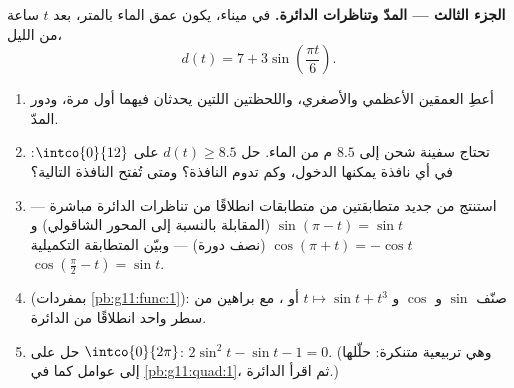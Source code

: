 \begin{problem}
\medskip
\noindent\textbf{الجزء الثالث --- المدّ وتناظرات
الدائرة.}
في ميناء، يكون عمق الماء بالمتر، بعد $t$ ساعة من
 الليل،
\[
d(t) = 7 + 3 \sin\!\left(\frac{\pi t}{6}\right).
\]
\begin{enumerate}[resume]
  \item أعطِ العمقين الأعظمي والأصغري، واللحظتين اللتين يحدثان
        فيهما أول مرة، ودور المدّ.
  \item تحتاج سفينة شحن إلى $8.5$ م من الماء. حل
        $d(t) \geq 8.5$ على $\intco{0}{12}$: في أي نافذة
        يمكنها الدخول، وكم تدوم النافذة؟ ومتى تُفتح
        النافذة التالية؟
  \item استنتج من جديد متطابقتين من متطابقات  انطلاقًا
        من تناظرات الدائرة مباشرة --- $\sin(\pi - t) = \sin t$ (المقابلة
        بالنسبة إلى المحور الشاقولي) و $\cos(\pi + t) = -\cos t$
        (نصف دورة) --- وبيّن المتطابقة التكميلية
        $\cos\left(\frac\pi2 - t\right) = \sin t$.
  \item {} (بمفردات \cref{pb:g11:func:1}): صنّف
        $\sin$ و $\cos$ و $t \mapsto \sin t + t^3$  أو
        ، مع براهين من سطر واحد انطلاقًا من الدائرة.
  \item حل على $\intco{0}{2\pi}$:
        $2\sin^2 t - \sin t - 1 = 0$. (وهي  تربيعية
        متنكرة: حلّلها إلى عوامل كما في \cref{pb:g11:quad:1}، ثم
        اقرأ الدائرة.)
\end{enumerate}


\end{problem}
